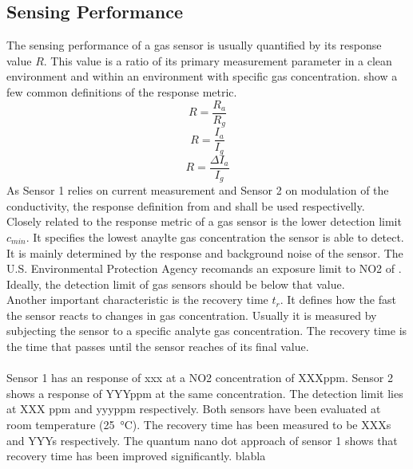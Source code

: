 {\subsection{Sensing Performance}
The sensing performance of a gas sensor is usually quantified by its response value $R$. This value is a ratio of its primary measurement parameter in a clean environment and within an environment with specific gas concentration.  show a few common definitions of the response metric.
\begin{equation}
\label{eqn:respone_1}
    R = \frac{R_a}{R_g}
\end{equation}
\begin{equation}
\label{eqn:respone_2}
    R = \frac{I_a}{I_g}
\end{equation}
\begin{equation}
\label{eqn:respone_3}
    R = \frac{\Delta I_a}{I_g}
\end{equation}
As Sensor 1 relies on current measurement and Sensor 2 on modulation of the conductivity, the response definition from  and  shall be used respectivelly. \\ 
Closely related to the response metric of a gas sensor is the lower detection limit $c_{min}$. It specifies the lowest anaylte gas concentration the sensor is able to detect. It is mainly determined by the response and background noise of the sensor. The U.S. Environmental Protection Agency recomands an exposure limit to NO2 of . Ideally, the detection limit of gas sensors should be below that value. \\
Another important characteristic is the recovery time $t_r$. It defines how the fast the sensor reacts to changes in gas concentration. Usually it is measured by subjecting the sensor to a specific analyte gas concentration. The recovery time is the time that passes until the sensor reaches  of its final value. \\
\\
Sensor 1 has an response of xxx at a NO2 concentration of XXXppm. Sensor 2 shows a response of YYYppm at the same concentration. The detection limit lies at XXX ppm and yyyppm respectively. Both sensors have been evaluated at room temperature (\SI{25}{\celsius}). The recovery time has been measured to be XXXs and YYYs respectively. 
The quantum nano dot approach of sensor 1 shows that recovery time has been improved significantly. blabla

}
